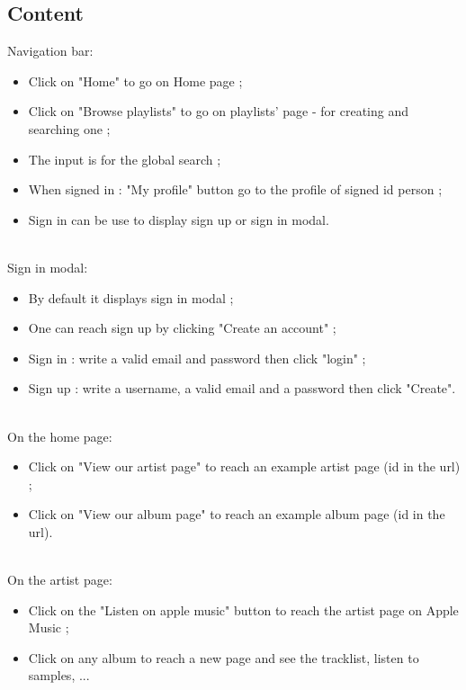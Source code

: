 \documentclass[11pt]{article}
\begin{document}
        \subsection{Content}
		\noindent
		Navigation bar:
		\begin{itemize}
		\item  Click on "Home" to go on Home page ;
		\item  Click on "Browse playlists" to go on playlists' page - for creating and searching one ;
		\item The input is for the global search ;
		\item When signed in : "My profile" button go to the profile of signed id person ;
		\item Sign in can be use to display sign up or sign in modal.
		\end{itemize}		
		\noindent \\
		Sign in modal:
		\begin{itemize}
		\item By default it displays sign in modal ;
		\item One can reach sign up by clicking "Create an account" ;
		\item Sign in : write a valid email and password then click "login"  ;
		\item Sign up : write a username, a valid email and a password then click "Create".
		\end{itemize}
		\noindent \\
		On the home page:
		\begin{itemize}
		\item Click on "View our artist page" to reach an example artist page (id in the url) ;
		\item Click on "View our album page" to reach an example album page (id in the url).
		\end{itemize}
		\noindent \\
		On the artist page:
		\begin{itemize}
		\item Click on the "Listen on apple music" button to reach the artist page on Apple Music ;
        \item Click on any album to reach a new page and see the tracklist, listen to samples, ...
        \end{itemize}
\end{document}
